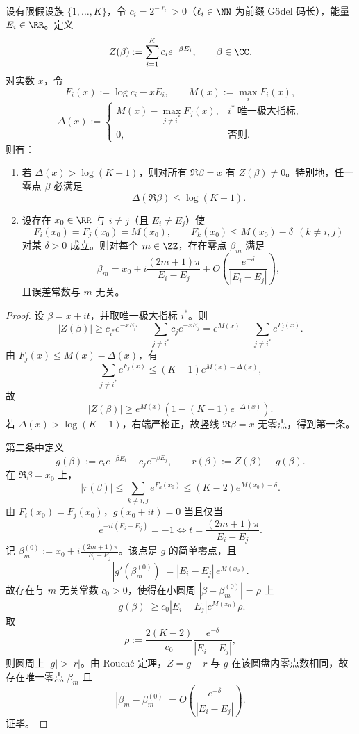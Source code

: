 \begin{theorem}\label{thm:xi-terminal-zm-godel-leyang-tropical-strip-lattice}
设有限假设族 \(\{1,\dots,K\}\)，令 \(c_i=2^{-\ell_i}>0\)（\(\ell_i\in\NN\) 为前缀 Gödel 码长），能量 \(E_i\in\RR\)。定义
\[
Z(\beta):=\sum_{i=1}^K c_i e^{-\beta E_i},\qquad \beta\in\CC.
\]
对实数 \(x\)，令
\[
F_i(x):=\log c_i-xE_i,\qquad
M(x):=\max_i F_i(x),
\]
\[
\Delta(x):=
\begin{cases}
M(x)-\max_{j\ne i^\ast}F_j(x), & i^\ast\ \text{唯一极大指标},\\
0, & \text{否则}.
\end{cases}
\]
则有：
\begin{enumerate}
  \item 若 \(\Delta(x)>\log(K-1)\)，则对所有 \(\Re\beta=x\) 有 \(Z(\beta)\neq 0\)。特别地，任一零点 \(\beta\) 必满足
  \[
  \Delta(\Re\beta)\le \log(K-1).
  \]
  \item 设存在 \(x_0\in\RR\) 与 \(i\neq j\)（且 \(E_i\neq E_j\)）使
  \[
  F_i(x_0)=F_j(x_0)=M(x_0),\qquad
  F_k(x_0)\le M(x_0)-\delta\ \ (k\ne i,j)
  \]
  对某 \(\delta>0\) 成立。则对每个 \(m\in\ZZ\)，存在零点 \(\beta_m\) 满足
  \[
  \beta_m
  =x_0+i\frac{(2m+1)\pi}{E_i-E_j}
  +O\!\left(\frac{e^{-\delta}}{|E_i-E_j|}\right),
  \]
  且误差常数与 \(m\) 无关。
\end{enumerate}
\end{theorem}
\begin{proof}
设 \(\beta=x+it\)，并取唯一极大指标 \(i^\ast\)。则
\[
|Z(\beta)|
\ge c_{i^\ast}e^{-xE_{i^\ast}}-\sum_{j\ne i^\ast}c_je^{-xE_j}
=e^{M(x)}-\sum_{j\ne i^\ast}e^{F_j(x)}.
\]
由 \(F_j(x)\le M(x)-\Delta(x)\)，有
\[
\sum_{j\ne i^\ast}e^{F_j(x)}\le (K-1)e^{M(x)-\Delta(x)},
\]
故
\[
|Z(\beta)|\ge e^{M(x)}\!\left(1-(K-1)e^{-\Delta(x)}\right).
\]
若 \(\Delta(x)>\log(K-1)\)，右端严格正，故竖线 \(\Re\beta=x\) 无零点，得到第一条。

第二条中定义
\[
g(\beta):=c_i e^{-\beta E_i}+c_j e^{-\beta E_j},\qquad
r(\beta):=Z(\beta)-g(\beta).
\]
在 \(\Re\beta=x_0\) 上，
\[
|r(\beta)|\le \sum_{k\ne i,j}e^{F_k(x_0)}\le (K-2)e^{M(x_0)-\delta}.
\]
由 \(F_i(x_0)=F_j(x_0)\)，\(g(x_0+it)=0\) 当且仅当
\[
e^{-it(E_i-E_j)}=-1
\Longleftrightarrow
t=\frac{(2m+1)\pi}{E_i-E_j}.
\]
记 \(\beta_m^{(0)}:=x_0+i\frac{(2m+1)\pi}{E_i-E_j}\)。该点是 \(g\) 的简单零点，且
\[
|g'(\beta_m^{(0)})|=|E_i-E_j|\,e^{M(x_0)}.
\]
故存在与 \(m\) 无关常数 \(c_0>0\)，使得在小圆周 \(|\beta-\beta_m^{(0)}|=\rho\) 上
\[
|g(\beta)|\ge c_0 |E_i-E_j| e^{M(x_0)}\rho.
\]
取
\[
\rho:=\frac{2(K-2)}{c_0}\frac{e^{-\delta}}{|E_i-E_j|},
\]
则圆周上 \(|g|>|r|\)。由 Rouch\'e 定理，\(Z=g+r\) 与 \(g\) 在该圆盘内零点数相同，故存在唯一零点 \(\beta_m\) 且
\[
|\beta_m-\beta_m^{(0)}|=O\!\left(\frac{e^{-\delta}}{|E_i-E_j|}\right).
\]
证毕。
\end{proof}

